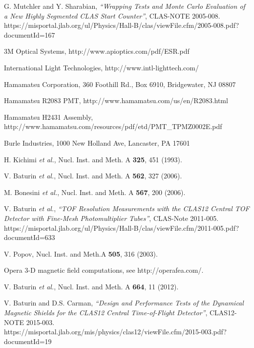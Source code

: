\documentclass{elsart}
\begin{document}
\begin{thebibliography}{99}
G. Mutchler and Y. Sharabian, {\it ``Wrapping Tests and Monte Carlo Evaluation of a New Highly 
Segmented CLAS Start Counter''}, CLAS-NOTE 2005-008.\\
https://misportal.jlab.org/ul/Physics/Hall-B/clas/viewFile.cfm/2005-008.pdf?documentId=167

3M Optical Systems, http://www.apioptics.com/pdf/ESR.pdf

International Light Technologies, http://www.intl-lighttech.com/

Hamamatsu Corporation, 360 Foothill Rd., Box 6910, Bridgewater, NJ 08807

Hamamatsu R2083 PMT, http://www.hamamatsu.com/us/en/R2083.html

Hamamatsu H2431 Assembly, \\
http://www.hamamatsu.com/resources/pdf/etd/PMT\_TPMZ0002E.pdf

Burle Industries, 1000 New Holland Ave, Lancaster, PA 17601

H. Kichimi {\it et al.}, Nucl. Inst. and Meth. A {\bf 325}, 451 (1993).

V. Baturin {\it et al.}, Nucl. Inst. and Meth. A {\bf 562}, 327 (2006).

M. Bonesini {\it et al.}, Nucl. Inst. and Meth. A {\bf 567}, 200 (2006).

V. Baturin {\it et al.}, {\it ``TOF Resolution Measurements with the CLAS12 Central TOF 
Detector with Fine-Mesh Photomultiplier Tubes''}, CLAS-Note 2011-005.\\
https://misportal.jlab.org/ul/Physics/Hall-B/clas/viewFile.cfm/2011-005.pdf?documentId=633

V. Popov, Nucl. Inst. and Meth.A {\bf 505}, 316 (2003).

Opera 3-D magnetic field computations, see http://operafea.com/.

V. Baturin {\it et al.}, Nucl. Inst. and Meth. A {\bf 664}, 11 (2012).

V. Baturin and D.S. Carman, {\it ``Design and Performance Tests of the Dynamical Magnetic Shields 
for the CLAS12 Central Time-of-Flight Detector''}, CLAS12-NOTE 2015-003.\\
https://misportal.jlab.org/mis/physics/clas12/viewFile.cfm/2015-003.pdf?documentId=19


\end{thebibliography}
\end{document}
